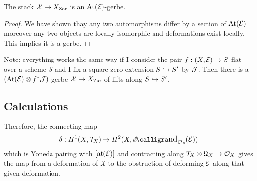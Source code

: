 \documentclass[12pt]{article}
\newcommand{\Zar}{\mathrm{Zar}}
\begin{document}
\begin{lemma}
The stack $\X \to X_{\Zar}$ is an $\mathrm{At}(\mathcal{E})$-gerbe. 
\end{lemma}

\begin{proof}
We have shown thay any two automorphisms differ by a section of $\mathrm{At}(\mathcal{E})$ moreover any two objects are locally isomorphic and deformations exist locally. This implies it is a gerbe. 
\end{proof}

Note: everything works the same way if I consider the pair $f : (X, \mathcal{E}) \to S$ flat over a scheme $S$ and I fix a square-zero extension $S \hookrightarrow S'$ by $\mathcal{J}$. Then there is a $(\mathrm{At}(\mathcal{E}) \otimes f^* \mathcal{J})$-gerbe $\X \to X_{\Zar}$ of lifts along $S \hookrightarrow S'$.

\subsection{Calculations}

Therefore, the connecting map
\[ \delta : H^1(X, \T_X) \to H^2(X, \shEnd{\struct{X}}{\E}) \]
which is Yoneda pairing with $[\mathrm{at}(\mathcal{E})]$ and contracting along $\mathcal{T}_X \otimes \Omega_X \to \mathcal{O}_{X}$ gives the map from a deformation of $X$ to the obstruction of deforming $\mathcal{E}$ along that given deformation. 
\end{document}
